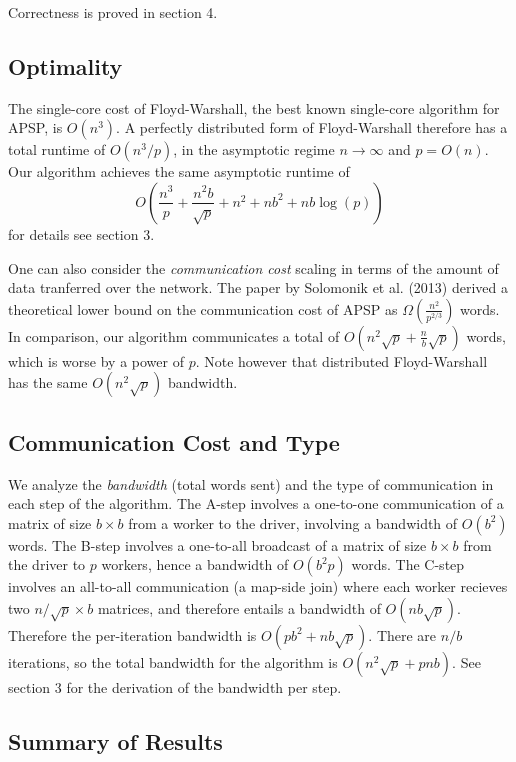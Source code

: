 \documentclass{article} %
\begin{document}
Correctness is proved in section 4.

\subsection{Optimality}

The single-core cost of Floyd-Warshall, the best known single-core
algorithm for APSP, is $O(n^3)$.  A perfectly distributed form of
Floyd-Warshall therefore has a total runtime of $O(n^3/p)$, in the
asymptotic regime $n \to \infty$ and $p = O(n)$.  Our algorithm
achieves the same asymptotic runtime of
\[
O\left(\frac{n^3}{p} + \frac{n^2b}{\sqrt{p}} + n^2 + nb^2 + nb\log(p)\right)
\]
for details see section 3.

One can also consider the \emph{communication cost} scaling in terms
of the amount of data tranferred over the network.  The paper by
Solomonik et al. (2013) derived a theoretical lower bound on the
communication cost of APSP as $\Omega(\frac{n^2}{p^{2/3}})$ words.  In
comparison, our algorithm communicates a total of $O(n^2\sqrt{p} +
\frac{n}{b}\sqrt{p})$ words, which is worse by a power of $p$.  Note
however that distributed Floyd-Warshall has the same $O(n^2\sqrt{p})$
bandwidth.

\subsection{Communication Cost and Type}

We analyze the \emph{bandwidth} (total words sent) and the type of
communication in each step of the algorithm.  The A-step involves a
one-to-one communication of a matrix of size $b \times b$ from a
worker to the driver, involving a bandwidth of $O(b^2)$ words.  The
B-step involves a one-to-all broadcast of a matrix of size $b\times b$
from the driver to $p$ workers, hence a bandwidth of $O(b^2 p)$ words.
The C-step involves an all-to-all communication (a map-side join)
where each worker recieves two $n/\sqrt{p} \times b$ matrices, and
therefore entails a bandwidth of $O(nb\sqrt{p})$.  Therefore the
per-iteration bandwidth is $O(pb^2 + nb\sqrt{p})$.
There are $n/b$ iterations, so the total bandwidth for the algorithm
is $O(n^2\sqrt{p} + pnb)$.  See section 3 for the
derivation of the bandwidth per step.

\subsection{Summary of Results}
\end{document}
